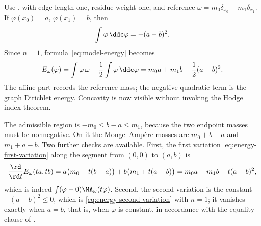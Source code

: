 \begin{example}
\label{ex:ch26-two-vertex-energy}
Use , with edge length one, residue weight one,
and reference
\(\omega=m_0\delta_{x_0}+m_1\delta_{x_1}\). If
\(\varphi(x_0)=a\), \(\varphi(x_1)=b\), then
\[
 \int\varphi\,\ddc\varphi=-(a-b)^2.
\]
Since \(n=1\), formula~\eqref{eq:model-energy} becomes
\[
 E_\omega(\varphi)
 =\int\varphi\,\omega+\frac12\int\varphi\,\ddc\varphi
 =m_0a+m_1b-\frac12(a-b)^2.
\]
The affine part records the reference mass; the negative quadratic term is
the graph Dirichlet energy. Concavity is now visible without invoking the
Hodge index theorem.

The admissible region is \(-m_0\leq b-a\leq m_1\), because the
two endpoint masses must be nonnegative.  On it the Monge--Amp\`ere masses are
\(m_0+b-a\) and \(m_1+a-b\).  Two further checks are available.  First, the
first variation \eqref{eq:energy-first-variation} along the segment from
\((0,0)\) to \((a,b)\) is
\[
 \frac{\rd}{\rd t}E_\omega(ta,tb)
 =a\bigl(m_0+t(b-a)\bigr)+b\bigl(m_1+t(a-b)\bigr)
 =m_0a+m_1b-t(a-b)^2,
\]
which is indeed \(\int(\varphi-0)\MA_\omega(t\varphi)\).  Second, the second
variation is the constant \(-(a-b)^2\leq0\), which is
\eqref{eq:energy-second-variation} with \(n=1\); it vanishes exactly when
\(a=b\), that is, when \(\varphi\) is constant, in accordance with the
equality clause of .
\end{example}

